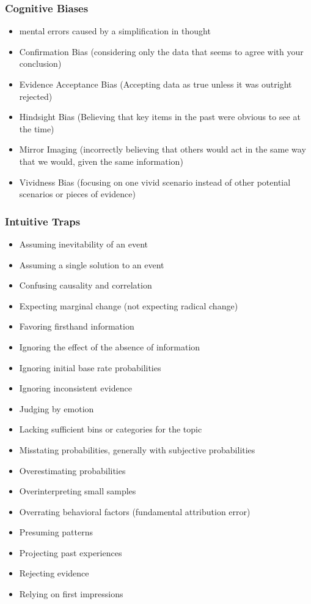 \documentclass[11pt]{article}
\begin{document}
\subsubsection{Cognitive Biases}
\label{sec:orgfcf3e53}
\begin{itemize}
\item mental errors caused by a simplification in thought
\item Confirmation Bias (considering only the data that seems to agree with your conclusion)
\item Evidence Acceptance Bias (Accepting data as true unless it was outright rejected)
\item Hindsight Bias (Believing that key items in the past were obvious to see at the time)
\item Mirror Imaging (incorrectly believing that others would act in the same way that we would, given the same information)
\item Vividness Bias (focusing on one vivid scenario instead of other potential scenarios or pieces of evidence)
\end{itemize}
\subsubsection{Intuitive Traps}
\label{sec:orgf70338b}
\begin{itemize}
\item Assuming inevitability of an event
\item Assuming a single solution to an event
\item Confusing causality and correlation
\item Expecting marginal change (not expecting radical change)
\item Favoring firsthand information
\item Ignoring the effect of the absence of information
\item Ignoring initial base rate probabilities
\item Ignoring inconsistent evidence
\item Judging by emotion
\item Lacking sufficient bins or categories for the topic
\item Misstating probabilities, generally with subjective probabilities
\item Overestimating probabilities
\item Overinterpreting small samples
\item Overrating behavioral factors (fundamental attribution error)
\item Presuming patterns
\item Projecting past experiences
\item Rejecting evidence
\item Relying on first impressions
\end{itemize}
\end{document}
